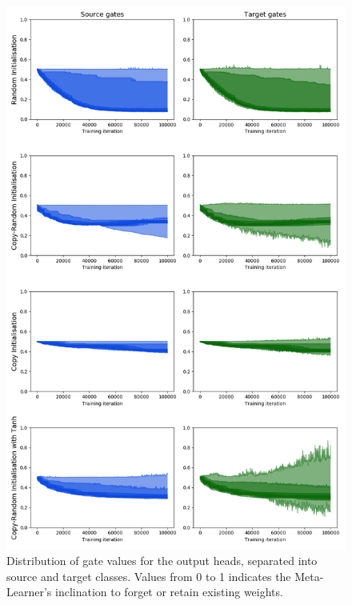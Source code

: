 \documentclass{report}
\begin{document}
\begin{figure}[!h]
	\centering
	\includegraphics[width=14cm]{gate-distrib}
	\caption{Distribution of gate values for the output heads, separated into source and target classes. Values from 0 to 1 indicates the Meta-Learner's inclination to forget or retain existing weights.}
	\label{fig:gate-distrib:1}
\end{figure}
\end{document}
